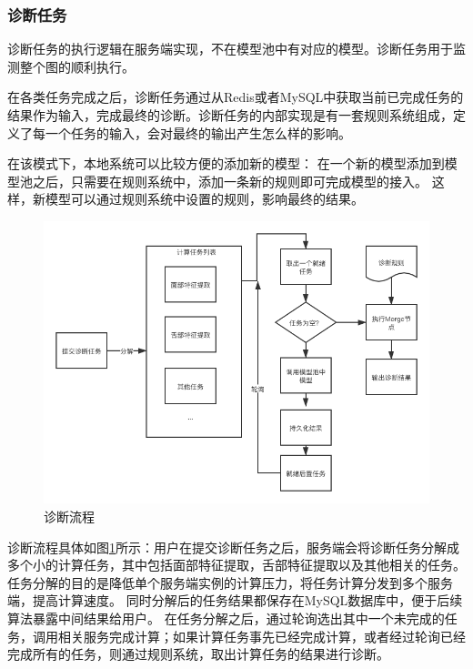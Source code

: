 \subsubsection{诊断任务}


诊断任务的执行逻辑在服务端实现，不在模型池中有对应的模型。诊断任务用于监测整个图的顺利执行。

在各类任务完成之后，诊断任务通过从Redis或者MySQL中获取当前已完成任务的结果作为输入，完成最终的诊断。诊断任务的内部实现是有一套规则系统组成，定义了每一个任务的输入，会对最终的输出产生怎么样的影响。

在该模式下，本地系统可以比较方便的添加新的模型： 在一个新的模型添加到模型池之后，只需要在规则系统中，添加一条新的规则即可完成模型的接入。
这样，新模型可以通过规则系统中设置的规则，影响最终的结果。

\begin{figure}[ht]
    \centering
    \includegraphics[width=12cm]{images/sketch3.png}
    \caption{诊断流程}
    \label{fig:sketch}
\end{figure}

诊断流程具体如图\ref{fig:sketch}所示：用户在提交诊断任务之后，服务端会将诊断任务分解成多个小的计算任务，其中包括面部特征提取，舌部特征提取以及其他相关的任务。任务分解的目的是降低单个服务端实例的计算压力，将任务计算分发到多个服务端，提高计算速度。
同时分解后的任务结果都保存在MySQL数据库中，便于后续算法暴露中间结果给用户。
在任务分解之后，通过轮询选出其中一个未完成的任务，调用相关服务完成计算；如果计算任务事先已经完成计算，或者经过轮询已经完成所有的任务，则通过规则系统，取出计算任务的结果进行诊断。



